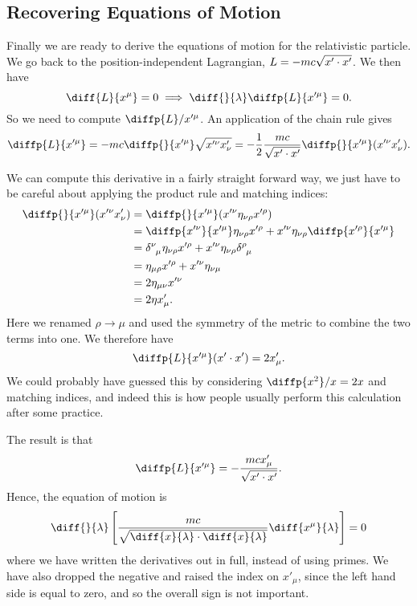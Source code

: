 \subsection{Recovering Equations of Motion}
Finally we are ready to derive the equations of motion for the relativistic particle.
We go back to the position-independent Lagrangian, \(L = -mc\sqrt{x'\cdot x'}\).
We then have
\begin{equation}
    \diff{\lagrangian}{x^\mu} = 0 \implies \diff{}{\lambda} \diffp{\lagrangian}{x'^\mu} = 0.
\end{equation}
So we need to compute \(\diffp{\lagrangian}/{x'^\mu}\).
An application of the chain rule gives
\begin{equation}
    \diffp{\lagrangian}{x'^\mu} = -mc \diffp{}{x'^\mu} \sqrt{x'^\nu x'_\nu} = -\frac{1}{2}\frac{mc}{\sqrt{x'\cdot x'}} \diffp{}{x'^\mu}(x'^\nu x'_\nu).
\end{equation}

We can compute this derivative in a fairly straight forward way, we just have to be careful about applying the product rule and matching indices:
\begin{align}
    \diffp{}{x'^\mu}(x'^\nu x'_\nu) &= \diffp{}{x'^\mu} (x'^\nu \eta_{\nu\rho} x'^\rho)\\
    &= \diffp{x'^\nu}{x'^\mu} \eta_{\nu\rho} x'^\rho + x'^\nu \eta_{\nu\rho} \diffp{x'^\rho}{x'^\mu}\\
    &= \tensor{\delta}{^\nu_\mu} \eta_{\nu\rho} x'^\rho + x'^\nu \eta_{\nu\rho} \tensor{\delta}{^\rho_\mu}\\
    &= \eta_{\mu\rho} x'^\rho + x'^\nu \eta_{\nu\mu}\\
    &= 2\eta_{\mu\nu} x'^\nu\\
    &= 2\eta x'_\mu.
\end{align}
Here we renamed \(\rho \to \mu\) and used the symmetry of the metric to combine the two terms into one.
We therefore have
\begin{equation}
    \diffp{\lagrangian}{x'^\mu} (x'\cdot x') = 2x'_\mu.
\end{equation}
We could probably have guessed this by considering \(\diffp{x^2}/{x} = 2x\) and matching indices, and indeed this is how people usually perform this calculation after some practice.

The result is that
\begin{equation}
    \diffp{\lagrangian}{x'^\mu} = -\frac{mc x'_\mu}{\sqrt{x'\cdot x'}}.
\end{equation}
Hence, the equation of motion is
\begin{equation}
    \diff{}{\lambda}\left[ \frac{mc}{\sqrt{\diff{x}{\lambda} \cdot \diff{x}{\lambda}}} \diff{x^\mu}{\lambda} \right] = 0
\end{equation}
where we have written the derivatives out in full, instead of using primes.
We have also dropped the negative and raised the index on \(x'_\mu\), since the left hand side is equal to zero, and so the overall sign is not important.


